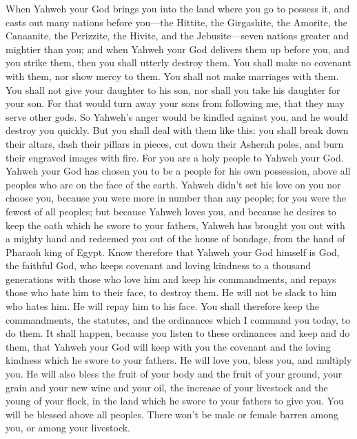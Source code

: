  When Yahweh your God brings you into the land where you go
to possess it, and casts out many nations before you---the Hittite, the
Girgashite, the Amorite, the Canaanite, the Perizzite, the Hivite, and
the Jebusite---seven nations greater and mightier than you; 
and when Yahweh your God delivers them up before you, and you strike
them, then you shall utterly destroy them. You shall make no covenant
with them, nor show mercy to them.  You shall not make
marriages with them. You shall not give your daughter to his son, nor
shall you take his daughter for your son.  For that would
turn away your sons from following me, that they may serve other gods.
So Yahweh's anger would be kindled against you, and he would destroy you
quickly.  But you shall deal with them like this: you shall
break down their altars, dash their pillars in pieces, cut down their
Asherah poles, and burn their engraved images with fire. 
For you are a holy people to Yahweh your God. Yahweh your God has chosen
you to be a people for his own possession, above all peoples who are on
the face of the earth.  Yahweh didn't set his love on you
nor choose you, because you were more in number than any people; for you
were the fewest of all peoples;  but because Yahweh loves
you, and because he desires to keep the oath which he swore to your
fathers, Yahweh has brought you out with a mighty hand and redeemed you
out of the house of bondage, from the hand of Pharaoh king of Egypt.
 Know therefore that Yahweh your God himself is God, the
faithful God, who keeps covenant and loving kindness to a thousand
generations with those who love him and keep his commandments,
 and repays those who hate him to their face, to destroy
them. He will not be slack to him who hates him. He will repay him to
his face.  You shall therefore keep the commandments, the
statutes, and the ordinances which I command you today, to do them.
 It shall happen, because you listen to these ordinances
and keep and do them, that Yahweh your God will keep with you the
covenant and the loving kindness which he swore to your fathers.
 He will love you, bless you, and multiply you. He will
also bless the fruit of your body and the fruit of your ground, your
grain and your new wine and your oil, the increase of your livestock and
the young of your flock, in the land which he swore to your fathers to
give you.  You will be blessed above all peoples. There
won't be male or female barren among you, or among your livestock.
